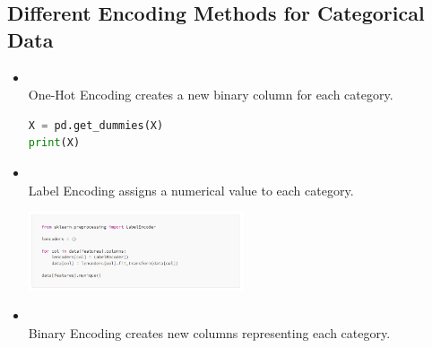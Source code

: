 \documentclass{article}
\begin{document}
\subsection{Different Encoding Methods for Categorical Data}
\begin{itemize}
    \item \textbf{\textcolor{blue}{}}\\
    One-Hot Encoding creates a new binary column for each category.
    \begin{lstlisting}[language=Python, caption={Logistic Regression Example}, label={lst:logreg}, backgroundcolor=\color{gray!10}, frame=single, keywordstyle=\color{blue}\bfseries, commentstyle=\color{green!50!black}, stringstyle=\color{orange}]
X = pd.get_dummies(X)
print(X)
    \end{lstlisting}
    \item \textbf{\textcolor{blue}{}}\\
    Label Encoding assigns a numerical value to each category.
    \begin{center}
        \includegraphics[width=0.5\textwidth]{label encoding} %
    \end{center}
    \item \textbf{\textcolor{blue}{}}\\
    Binary Encoding creates new columns representing each category.
\end{itemize}
\end{document}
